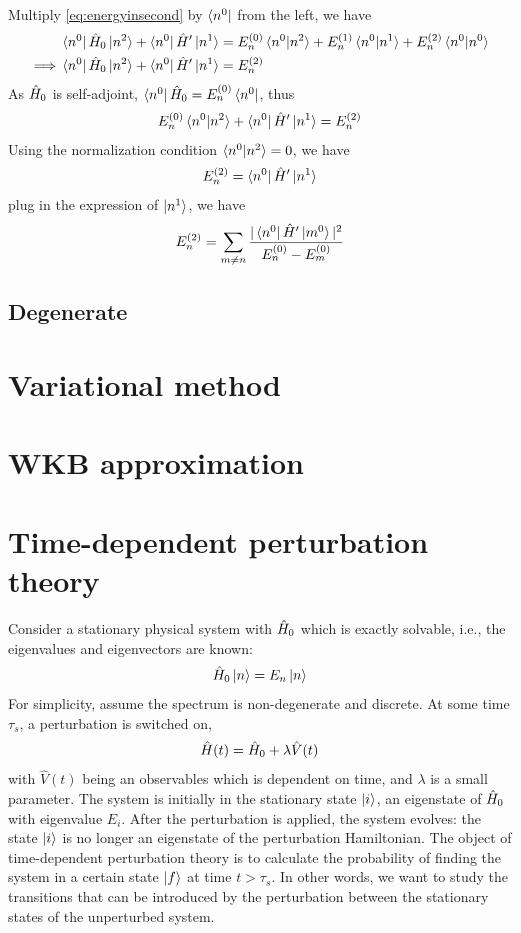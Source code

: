 Multiply \cref{eq:energyinsecond} by $\bra{n^0}$ from the left, we have
\begin{align*}
    &\bra{n^0} \hat{H}_0 \ket{n^2} + \bra{n^0} \hat{H}' \ket{n^1} = E_n^{(0)} \braket{n^0|n^2} + E_n^{(1)} \braket{n^0|n^1} + E_n^{(2)} \braket{n^0|n^0} \\
    \implies &\bra{n^0} \hat{H}_0 \ket{n^2} + \bra{n^0} \hat{H}' \ket{n^1} = E_n^{(2)}
\end{align*}
As $\hat{H}_0$ is self-adjoint, $\bra{n^0} \hat{H}_0 = E_n^{(0)} \bra{n^0}$, thus
\begin{align*}
    E_n^{(0)} \braket{n^0|n^2} + \bra{n^0} \hat{H}' \ket{n^1} = E_n^{(2)}
\end{align*}
Using the normalization condition $\braket{n^0|n^2} = 0$, we have 
\begin{align}
    E_n^{(2)} = \bra{n^0} \hat{H}' \ket{n^1}
\end{align}
plug in the expression of $\ket{n^1}$, we have
\begin{align}
    E_n^{(2)} = \sum_{m \neq n} \frac{|\bra{n^0} \hat{H}' \ket{m^0}|^2}{E_n^{(0)} - E_m^{(0)}}
\end{align}
\subsection{Degenerate}





\section{Variational method}

\section{WKB approximation}

\section{Time-dependent perturbation theory}

Consider a stationary physical system with $\hat{H}_0$ which is exactly solvable, i.e., the eigenvalues and eigenvectors are known: 
\begin{align}
    \hat{H}_0 \ket{n} = E_n \ket{n}
\end{align}
For simplicity, assume the spectrum is non-degenerate and discrete. At some time $\tau_s$, a perturbation is switched on, 
\begin{align}
    \hat{H}(t) = \hat{H}_0 + \lambda \hat{V} (t)
\end{align}
with $\hat{V}(t)$ being an observables which is dependent on time, and $\lambda$ is a small parameter. The system is initially in the stationary state $\ket{i}$, an eigenstate of $\hat{H}_0$ with eigenvalue $E_i$. After the perturbation is applied, the system evolves: the state $\ket{i}$ is no longer an eigenstate of the perturbation Hamiltonian. The object of time-dependent perturbation theory is to calculate the probability of finding the system in a certain state $\ket{f}$ at time $t > \tau_s$. In other words, we want to study the transitions that can be introduced by the perturbation between the stationary states of the unperturbed system.

